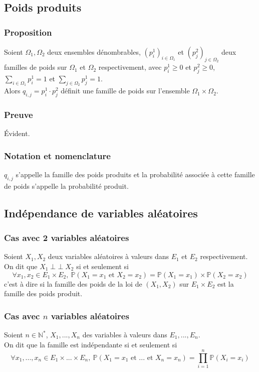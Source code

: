 \documentclass[a4paper,10pt]{book} %
\newcommand{\N}{\mathbb{N}}
\renewcommand{\P}{\mathbb{P}} %
\DeclareMathOperator{\ind}{\perp \!\!\! \perp}
\begin{document}
\subsection{Poids produits}
\subsubsection{Proposition}\label{proposition2.3.1}
Soient $\Omega_1,\Omega_2$ deux ensembles dénombrables, $(p_i^1)_{i\in\Omega_1}$ et $(p_j^2)_{j\in\Omega_2}$ deux familles de poids sur $\Omega_1$ et $\Omega_2$ respectivement, avec $p_i^1\geq 0$ et $p_j^2\geq 0$, $\displaystyle\sum_{i\in\Omega_1}p_i^1=1$ et $\displaystyle\sum_{j\in\Omega_2}p_j^1=1$.\\

Alors $q_{i,j}=p_i^1\cdot p_j^2$ définit une famille de poids sur l'ensemble $\Omega_1\times \Omega_2$.

\subsubsection{Preuve}
Évident.

\subsubsection{Notation et nomenclature}
$q_{i,j}$ s'appelle la famille des poids produits et la probabilité associée à cette famille de poids s'appelle la probabilité produit.

\subsection{Indépendance de variables aléatoires}
\subsubsection{Cas avec 2 variables aléatoires}
Soient $X_1, X_2$ deux variables aléatoires à valeurs dans $E_1$ et $E_2$ respectivement.\\
On dit que $X_1\ind X_2$ si et seulement si $$\forall x_1,x_2\in E_1\times E_2, ~\P(X_1=x_1\text{ et }X_2=x_2)=\P(X_1=x_1)\times \P(X_2=x_2)$$
c'est à dire si la famille des poids de la loi de $(X_1,X_2)$ sur $E_1\times E_2$ est la famille des poids produit.

\subsubsection{Cas avec $n$ variables aléatoires}
Soient $n\in \N^*$, $X_1,...,X_n$ des variables à valeurs dans $E_1,...,E_n$.\\
On dit que la famille est indépendante si et seulement si $$\forall x_1,...,x_n\in E_1\times...\times E_n,~\P(X_1=x_1\text{ et ... et }X_n=x_n)=\prod_{i=1}^{n}\P(X_i=x_i)$$
\end{document}
